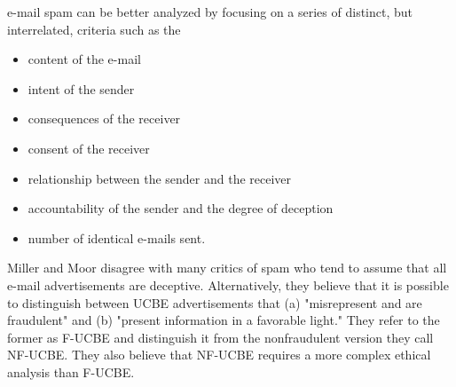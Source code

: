 \documentclass[12pt]{article}
\theoremstyle{definition}
\begin{document}
e-mail spam can be better analyzed by focusing on a series of distinct, but interrelated,
criteria such as the
\begin{itemize}
\item content of the e-mail
\item intent of the sender
\item consequences of the receiver
\item consent of the receiver
\item relationship between the sender and the receiver
\item accountability of the sender and the degree of deception
\item number of identical e-mails sent.
\end{itemize}
Miller and Moor disagree with many critics of spam who tend to assume that all
e-mail advertisements are deceptive. Alternatively, they believe that it is possible to
distinguish between UCBE advertisements that (a) "misrepresent and are fraudulent"
and (b) "present information in a favorable light." They refer to the former as F-UCBE
and distinguish it from the nonfraudulent version they call NF-UCBE. They also believe
that NF-UCBE requires a more complex ethical analysis than F-UCBE.
\end{document}
